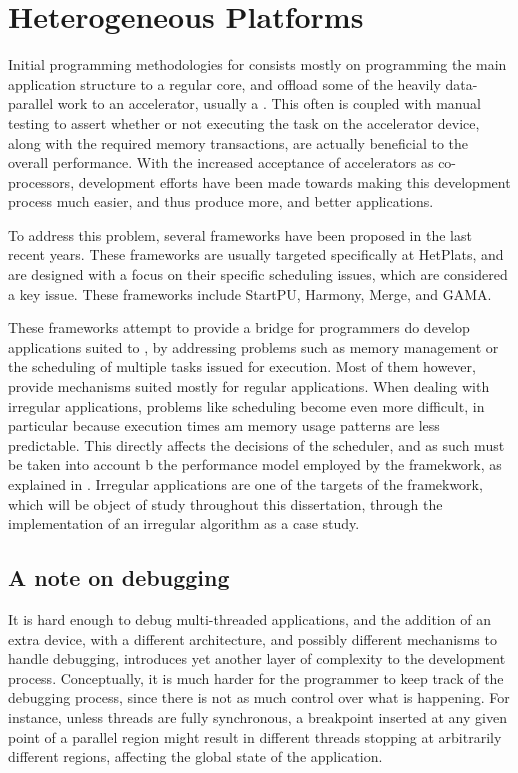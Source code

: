 \documentclass[main.tex]{subfiles}
\begin{document}
\section{Heterogeneous Platforms}

Initial programming methodologies for \hetplats consists mostly on programming the main application structure to a regular \cpu core, and offload some of the heavily data-parallel work to an accelerator, usually a \gpu. This often is coupled with manual testing to assert whether or not executing the task on the accelerator device, along with the required memory transactions, are actually beneficial to the overall performance. 
With the increased acceptance of accelerators as co-processors, development efforts have been made towards making this development process much easier, and thus produce more, and better applications.

To address this problem, several frameworks have been proposed in the last recent years. These frameworks are usually targeted specifically at \acp{HetPlat}, and are designed with a focus on their specific scheduling issues, which are considered a key issue. These frameworks include StartPU, Harmony, Merge, and GAMA.  

These frameworks attempt to provide a bridge for programmers do develop applications suited to \hetplat, by addressing problems such as memory management or the scheduling of multiple tasks issued for execution. Most of them however, provide mechanisms suited mostly for regular applications. When dealing with irregular applications, problems like scheduling become even more difficult, in particular because execution times am memory usage patterns are less predictable. This directly affects the decisions of the scheduler, and as such must be taken into account b the performance model employed by the framekwork, as explained in . Irregular applications are one of the targets of the \gama framekwork, which will be object of study throughout this dissertation, through the implementation of an irregular algorithm as a case study.

\subsection{A note on debugging}

It is hard enough to debug multi-threaded \cpu applications, and the addition of an extra device, with a different architecture, and possibly different mechanisms to handle debugging, introduces yet another layer of complexity to the development process. Conceptually, it is much harder for the programmer to keep track of the debugging process, since there is not as much control over what is happening. For instance, unless threads are fully synchronous, a breakpoint inserted at any given point of a parallel region might result in different threads stopping at arbitrarily different regions, affecting the global state of the application.
\end{document}
